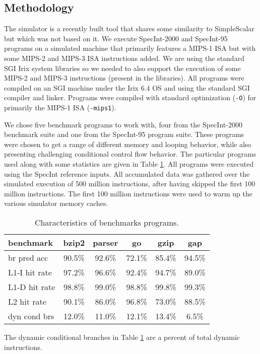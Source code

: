 \documentclass[10pt,twocolumn,dvips]{article}
\begin{document}
\subsection{Methodology}
%
The simulator is a recently built tool that shares some similarity
to SimpleScalar \cite{Austin97} but which was not based on it.
We execute
SpecInt-2000 and SpecInt-95 programs on a simulated machine
that primarily features a MIPS-1 ISA but with some MIPS-2 and
MIPS-3 ISA instructions added.  We are using the standard SGI Irix system
libraries so we needed to also support the execution of some
MIPS-2 and MIPS-3 instructions (present in the libraries).
All programs were compiled on an SGI machine under the
Irix 6.4 OS and using the standard SGI compiler and linker.  
Programs were compiled with
standard optimization ({\tt -O}) for primarily the MIPS-1 ISA ({\tt -mips1}).

We chose five benchmark programs to work with,
four from the SpecInt-2000 benchmark suite
and one from the SpecInt-95 program suite.
These programs were chosen to get a range of different memory and looping
behavior, while also presenting challenging conditional control flow
behavior.
The particular programs used along with some statistics 
are given in Table \ref{tab:benches}.
All programs were executed using the SpecInt reference inputs.
All accumulated data was gathered over the simulated execution of
500 million instructions,
after having skipped the first 100 million instructions.
The first 100 million instructions were used to warm up the
various simulator memory caches.
%
\begin{table}
\scriptsize{
\begin{center}
\caption{Characteristics of benchmarks programs.}
\label{tab:benches}
\begin{tabular}{|l|c|c|c|c|c|}
\hline 
benchmark&bzip2&parser&go&gzip&gap\\
\hline 
\hline 
br pred acc&90.5\%&92.6\%&72.1\%&85.4\%&94.5\%\\
\hline 
L1-I hit rate&97.2\%&96.6\%&92.4\%&94.7\%&89.0\%\\
\hline 
L1-D hit rate&98.8\%&99.0\%&98.8\%&99.8\%&99.3\%\\
\hline 
L2 hit rate&90.1\%&86.0\%&96.8\%&73.0\%&88.5\%\\
\hline 
dyn cond brs&12.0\%&11.0\%&12.1\%&13.4\%&6.5\%\\
\hline
\end{tabular}
\end{center}
}
\end{table}
%
The dynamic conditional branches in Table \ref{tab:benches} are
a percent of total dynamic instructions.
%
%
\end{document}
